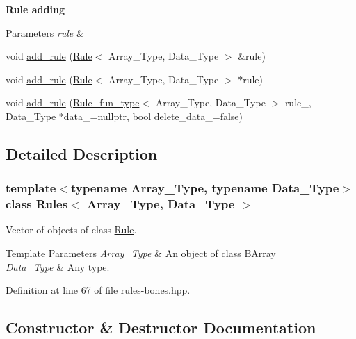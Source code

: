 \begin{Indent}\textbf{ Rule adding}\par
{\em 
\begin{DoxyParams}{Parameters}
{\em rule} & \\
\hline
\end{DoxyParams}
}\begin{DoxyCompactItemize}
\item 
void \hyperlink{class_rules_a60583152fddcb11178dcf3d02a924d7c}{add\+\_\+rule} (\hyperlink{class_rule}{Rule}$<$ Array\+\_\+\+Type, Data\+\_\+\+Type $>$ \&rule)
\item 
void \hyperlink{class_rules_abd60b1d381ad0c8a772e4d81264bbe0a}{add\+\_\+rule} (\hyperlink{class_rule}{Rule}$<$ Array\+\_\+\+Type, Data\+\_\+\+Type $>$ $\ast$rule)
\item 
void \hyperlink{class_rules_abbc63747014445b538384bb500464bb5}{add\+\_\+rule} (\hyperlink{typedefs_8hpp_a2e147c9c0e8b65be614c98a5dd400d5c}{Rule\+\_\+fun\+\_\+type}$<$ Array\+\_\+\+Type, Data\+\_\+\+Type $>$ rule\+\_\+, Data\+\_\+\+Type $\ast$data\+\_\+=nullptr, bool delete\+\_\+data\+\_\+=false)
\end{DoxyCompactItemize}
\end{Indent}


\subsection{Detailed Description}
\subsubsection*{template$<$typename Array\+\_\+\+Type, typename Data\+\_\+\+Type$>$\newline
class Rules$<$ Array\+\_\+\+Type, Data\+\_\+\+Type $>$}

Vector of objects of class \hyperlink{class_rule}{Rule}. 


\begin{DoxyTemplParams}{Template Parameters}
{\em Array\+\_\+\+Type} & An object of class {\ttfamily \hyperlink{class_b_array}{B\+Array}} \\
\hline
{\em Data\+\_\+\+Type} & Any type. \\
\hline
\end{DoxyTemplParams}


Definition at line 67 of file rules-\/bones.\+hpp.



\subsection{Constructor \& Destructor Documentation}
\mbox{\label{class_rules_aa78e9abf82ed8a0e4320d570191c8968}} 
